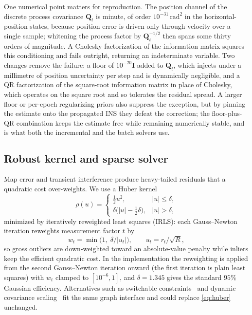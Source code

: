 \documentclass{IEEEtaes}
\begin{document}
One numerical point matters for reproduction. The position channel of the discrete
process covariance $\mathbf{Q}_t$ is minute, of order $10^{-31}\,\mathrm{rad}^2$ in
the horizontal-position states, because position error is driven only through velocity
over a single sample; whitening the process factor by $\mathbf{Q}_t^{-1/2}$ then spans
some thirty orders of magnitude. A Cholesky factorization of the information matrix
squares this conditioning and fails outright, returning an indeterminate variable. Two
changes remove the failure: a floor of $10^{-20}\mathbf{I}$ added to $\mathbf{Q}_t$,
which injects under a millimetre of position uncertainty per step and is dynamically
negligible, and a QR factorization of the square-root information matrix in place of
Cholesky, which operates on the square root and so tolerates the residual spread. A
larger floor or per-epoch regularizing priors also suppress the exception, but by
pinning the estimate onto the propagated INS they defeat the correction; the
floor-plus-QR combination keeps the estimate free while remaining numerically stable,
and is what both the incremental and the batch solvers use.

\subsection{Robust kernel and sparse solver}
Map error and transient interference produce heavy-tailed
residuals that a quadratic cost over-weights. We use a Huber kernel~\cite{huber1964}
\begin{equation}
\rho(u)=\begin{cases}\tfrac12 u^2,& |u|\le\delta,\\
\delta\big(|u|-\tfrac12\delta\big),& |u|>\delta,\end{cases}
\label{eq:huber}
\end{equation}
minimized by iteratively reweighted least squares (IRLS): each Gauss--Newton
iteration reweights measurement factor $t$ by
\begin{equation}
w_t=\min\!\big(1,\;\delta/|u_t|\big),\qquad u_t=r_t/\sqrt{R},
\label{eq:irls}
\end{equation}
so gross outliers are down-weighted toward an absolute-value penalty while inliers
keep the efficient quadratic cost. In the implementation the reweighting is applied
from the second Gauss--Newton iteration onward (the first iteration is plain least
squares) with $w_t$ clamped to $[10^{-6},1]$, and $\delta=1.345$ gives the standard
$95\%$ Gaussian efficiency. Alternatives such as switchable
constraints~\cite{sunderhauf2012} and dynamic covariance
scaling~\cite{agarwal2013} fit the same graph interface and could replace
\eqref{eq:huber} unchanged.
\end{document}
